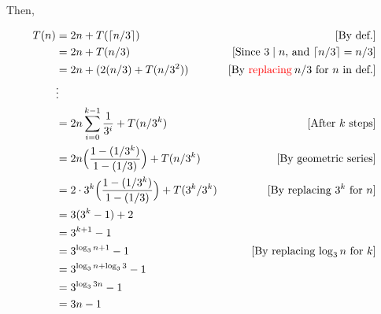\documentclass[12pt]{article}
\begin{document}
\begin{itemize}
\begin{mdframed}
        \bigskip

        Then,

        \bigskip

        \begin{align}
            T(n) &= 2n + T(\lceil n/3 \rceil) & [\text{By def.}]\\
            &= 2n + T(n/3) & [\text{Since $3 \mid n$, and $\lceil n/3 \rceil = n/3$}]\\
            &= 2n + (2(n/3) + T(n/3^2)) & [\text{By \color{red}replacing\color{black}\:$n/3$ for $n$ in def.}]\\
            &\vdots\\
            &=2n\sum\limits_{i=0}^{k-1} \frac{1}{3^i} + T(n/3^k) & [\text{After $k$ steps}]\\
            &=2n \Bigl( \frac{1 - (1/3^k)}{1 - (1/3)} \Bigr) + T(n/3^k) & [\text{By geometric series}]\\
            &=2 \cdot 3^k \Bigl( \frac{1 - (1/3^k)}{1 - (1/3)}  \Bigr) + T(3^k/3^k) & [\text{By replacing $3^k$ for $n$}]\\
            &=3(3^k - 1) + 2\\
            &=3^{k+1} - 1\\
            &=3^{\log_3 n + 1} - 1 & [\text{By replacing $\log_3 n$ for $k$}]\\
            &=3^{\log_3 n + \log_3 3} - 1\\
            &=3^{\log_3 3n} - 1\\
            &=3n - 1
        \end{align}
    \end{mdframed}









\end{itemize}
\end{document}
